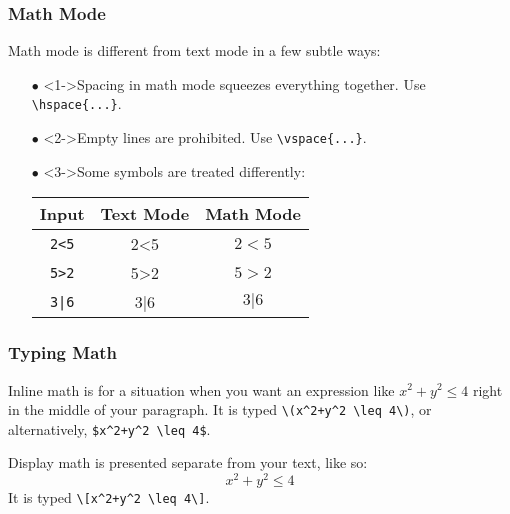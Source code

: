 \begin{frame}[fragile]
	\frametitle{Math Mode}
	Math mode is different from text mode in a few subtle ways:
	\begin{itemize}
		\item[$\bullet$]<1->Spacing in math mode squeezes everything together. Use \verb|\hspace{...}|.
		\item[$\bullet$]<2->Empty lines are prohibited. Use \verb|\vspace{...}|.
		\item[$\bullet$]<3->Some symbols are treated differently:
			\begin{tabular}{c | c | c}
			Input & Text Mode & Math Mode\\
			\hline
			\verb|2<5| & 2<5 & $2<5$\\
			\verb|5>2| & 5>2 & $5>2$\\
			\verb,3|6, & 3|6& $3|6$
			\end{tabular}			
	\end{itemize}
\end{frame}

\begin{frame}[fragile]
	\frametitle{Typing Math}
	\begin{multicols}{2}
		Inline math is for a situation when you want an expression like \(x^2+y^2 \leq 4\) right in the middle of your paragraph. It is typed \verb|\(x^2+y^2 \leq 4\)|, or alternatively, \verb|$x^2+y^2 \leq 4$|.
		
		\columnbreak
		\pause
		Display math is presented separate from your text, like so:
		\[x^2+y^2 \leq 4\]
		It is typed \verb|\[x^2+y^2 \leq 4\]|.
	\end{multicols}
	\begin{comment}
	You can force Display-sized math in an inline environment by prefixing the expression with \verb|\displaystyle|:
	\verb|\( \displaystyle x^2+y^2 \leq 4\)|
	\end{comment}
\end{frame}

